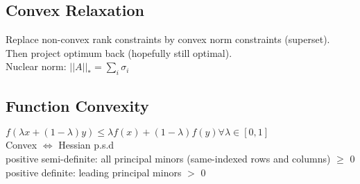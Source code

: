 \subsection*{Convex Relaxation}
Replace non-convex rank constraints by convex norm constraints (superset). Then project optimum back (hopefully still optimal).\\
Nuclear norm: $||A||_* = \sum_i \sigma_i$


\subsection*{Function Convexity}
$f(\lambda x+(1-\lambda)y)\leq\lambda f(x)+(1-\lambda)f(y) \forall\lambda\in[0,1]$\\
Convex $\iff$ Hessian p.s.d\\
positive semi-definite: all principal minors (same-indexed rows and columns) $\geq$ 0\\
positive definite: leading principal minors $>$ 0
